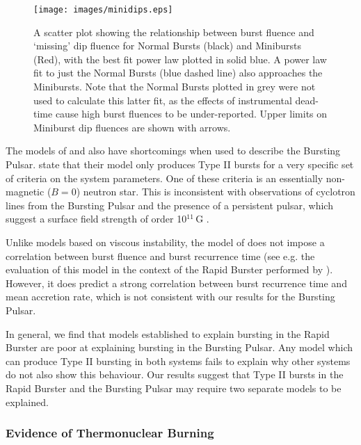 \begin{figure}
  \centering
  \texttt{[image: images/minidips.eps]}
  \caption[A scatter plot showing the relationship between burst fluence and `missing' dip fluence for Normal Bursts and Minibursts.]{\small A scatter plot showing the relationship between burst fluence and `missing' dip fluence for Normal Bursts (black) and Minibursts (Red), with the best fit power law plotted in solid blue.  A power law fit to just the Normal Bursts (blue dashed line) also approaches the Minibursts.  Note that the Normal Bursts plotted in grey were not used to calculate this latter fit, as the effects of instrumental dead-time cause high burst fluences to be under-reported.  Upper limits on Miniburst dip fluences are shown with arrows.}
  \label{fig:minidips}
\end{figure}

\par The models of \citet{Spruit_Type2Mod} and \citet{Walker_Type2Mod} also have shortcomings when used to describe the Bursting Pulsar.  \citet{Walker_Type2Mod} state that their model only produces Type II bursts for a very specific set of criteria on the system parameters.   One of these criteria is an essentially non-magnetic ($B=0$) neutron star.  This is inconsistent with observations of cyclotron lines from the Bursting Pulsar and the presence of a persistent pulsar, which suggest a surface field strength of order 10$^{11}$\,G \citep{Doroshenko_NBFlash}.
\par Unlike models based on viscous instability, the model of \citet{Spruit_Type2Mod} does not impose a correlation between burst fluence and burst recurrence time (see e.g. the evaluation of this model in the context of the Rapid Burster performed by \citealp{Bagnoli_PopStudy}).  However, it does predict a strong correlation between burst recurrence time and mean accretion rate, which is not consistent with our results for the Bursting Pulsar.
\par In general, we find that models established to explain bursting in the Rapid Burster are poor at explaining bursting in the Bursting Pulsar.  Any model which can produce Type II bursting in both systems fails to explain why other systems do not also show this behaviour.  Our results suggest that Type II bursts in the Rapid Burster and the Bursting Pulsar may require two separate models to be explained.

\subsubsection{Evidence of Thermonuclear Burning}

